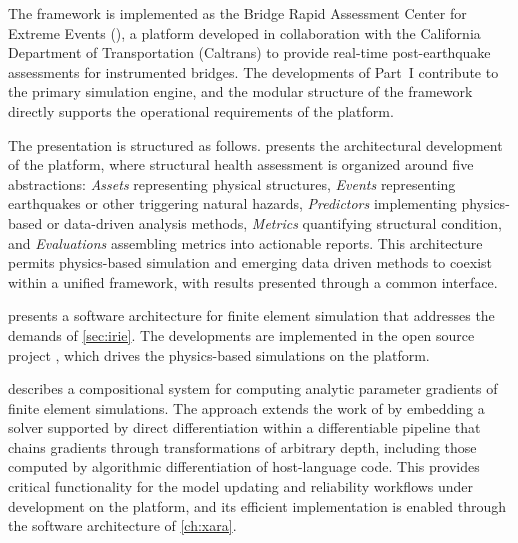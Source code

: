 The framework is implemented as the Bridge Rapid Assessment Center for Extreme Events (\BRACE{}), a platform developed in collaboration with the California Department of Transportation (Caltrans) to provide real-time post-earthquake assessments for instrumented bridges.
The developments of Part~I contribute to the primary simulation engine, and the modular structure of the framework directly supports the operational requirements of the platform.

The presentation is structured as follows. 
 presents the architectural development of the \BRACE{} platform, where structural health assessment is organized around five abstractions: \emph{Assets} representing physical structures, \emph{Events} representing earthquakes or other triggering natural hazards, \emph{Predictors} implementing physics-based or data-driven analysis methods, \emph{Metrics} quantifying structural condition, and \emph{Evaluations} assembling metrics into actionable reports.
This architecture permits physics-based simulation and emerging data driven methods to coexist within a unified framework, with results presented through a common interface. 

 presents a software architecture for finite element simulation that addresses the demands of \cref{sec:irie}. 
The developments are implemented in the open source project \Xara{}, which drives the physics-based simulations on the \BRACE{} platform. 

 describes a compositional system for computing
analytic parameter gradients of finite element simulations.  The
approach extends the work of 
\cite{haukaas2003finite,scott2007response} by embedding a solver supported by direct differentiation within a
differentiable pipeline that chains gradients through transformations
of arbitrary depth, including those computed by algorithmic
differentiation of host-language code.  
This provides critical functionality for the model updating and reliability workflows under development on the \BRACE{} platform, and its efficient implementation is enabled through the software architecture of \cref{ch:xara}.
